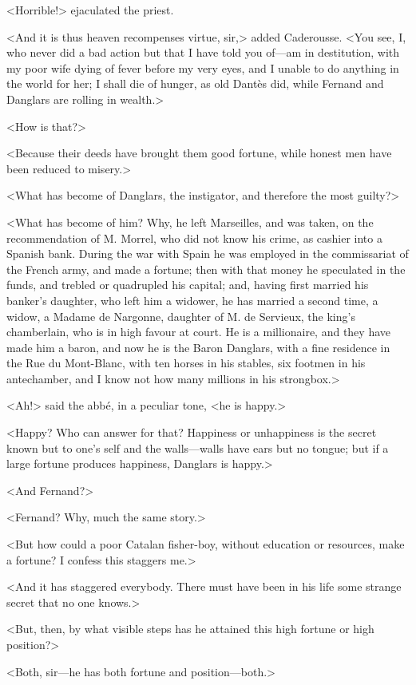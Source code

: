  <Horrible!> ejaculated the priest. 

 <And it is thus heaven recompenses virtue, sir,> added Caderousse. <You see, I, who never did a bad action but that I have told you of—am in destitution, with my poor wife dying of fever before my very eyes, and I unable to do anything in the world for her; I shall die of hunger, as old Dantès did, while Fernand and Danglars are rolling in wealth.> 

 <How is that?> 

 <Because their deeds have brought them good fortune, while honest men have been reduced to misery.> 

 <What has become of Danglars, the instigator, and therefore the most guilty?> 

 <What has become of him? Why, he left Marseilles, and was taken, on the recommendation of M. Morrel, who did not know his crime, as cashier into a Spanish bank. During the war with Spain he was employed in the commissariat of the French army, and made a fortune; then with that money he speculated in the funds, and trebled or quadrupled his capital; and, having first married his banker's daughter, who left him a widower, he has married a second time, a widow, a Madame de Nargonne, daughter of M. de Servieux, the king's chamberlain, who is in high favour at court. He is a millionaire, and they have made him a baron, and now he is the Baron Danglars, with a fine residence in the Rue du Mont-Blanc, with ten horses in his stables, six footmen in his antechamber, and I know not how many millions in his strongbox.> 

 <Ah!> said the abbé, in a peculiar tone, <he is happy.> 

 <Happy? Who can answer for that? Happiness or unhappiness is the secret known but to one's self and the walls—walls have ears but no tongue; but if a large fortune produces happiness, Danglars is happy.> 

 <And Fernand?> 

 <Fernand? Why, much the same story.> 

 <But how could a poor Catalan fisher-boy, without education or resources, make a fortune? I confess this staggers me.> 

 <And it has staggered everybody. There must have been in his life some strange secret that no one knows.> 

 <But, then, by what visible steps has he attained this high fortune or high position?> 

 <Both, sir—he has both fortune and position—both.> 

